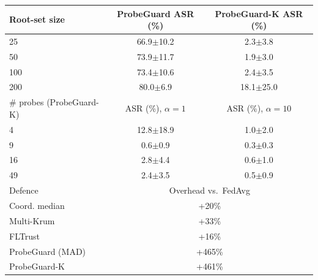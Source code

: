 \begin{tabular}{@{}lcc@{}}
\toprule
Root-set size & ProbeGuard ASR (\%) & ProbeGuard-K ASR (\%)\\
\midrule
25 & 66.9$\pm$10.2 & 2.3$\pm$3.8\\
50 & 73.9$\pm$11.7 & 1.9$\pm$3.0\\
100 & 73.4$\pm$10.6 & 2.4$\pm$3.5\\
200 & 80.0$\pm$6.9 & 18.1$\pm$25.0\\
\midrule
\# probes (ProbeGuard-K) & ASR (\%), $\alpha{=}1$ & ASR (\%), $\alpha{=}10$\\
\midrule
4 & 12.8$\pm$18.9 & 1.0$\pm$2.0\\
9 & 0.6$\pm$0.9 & 0.3$\pm$0.3\\
16 & 2.8$\pm$4.4 & 0.6$\pm$1.0\\
49 & 2.4$\pm$3.5 & 0.5$\pm$0.9\\
\midrule
Defence & \multicolumn{2}{c}{Overhead vs.\ FedAvg}\\
\midrule
Coord. median & \multicolumn{2}{c}{+20\%}\\
Multi-Krum & \multicolumn{2}{c}{+33\%}\\
FLTrust & \multicolumn{2}{c}{+16\%}\\
ProbeGuard (MAD) & \multicolumn{2}{c}{+465\%}\\
ProbeGuard-K & \multicolumn{2}{c}{+461\%}\\
\bottomrule
\end{tabular}